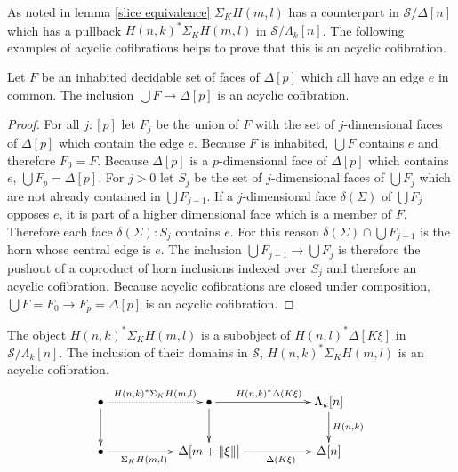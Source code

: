 \documentclass{tac}
\newcommand\cat\mathcal
\newcommand\ri{^*}
\newcommand\of{:}
\newcommand\simplex\Delta
\newcommand\horn\Lambda
\newcommand\norm[1]{\Vert #1 \Vert}
\newcommand\depsum{\Sigma_}
\newcommand\face\delta
\begin{document}
As noted in lemma \ref{slice equivalence} $\depsum K H(m,l)$ has a counterpart in $\cat S/\simplex[n]$ which has a pullback $H(n,k)\ri \depsum K H(m,l)$ in $\cat S/\horn_k[n]$. The following examples of acyclic cofibrations helps to prove that this is an acyclic cofibration.

\begin{lemma} Let $F$ be an inhabited decidable set of faces of $\simplex[p]$ which all have an edge $e$ in common. The inclusion $\bigcup F\to \simplex[p]$ is an acyclic cofibration. \label{face completion} \end{lemma}

\begin{proof} For all $j\of[p]$ let $F_j$ be the union of $F$ with the set of $j$-dimensional faces of $\simplex[p]$ which contain the edge $e$. Because $F$ is inhabited, $\bigcup F$ contains $e$ and therefore $F_0=F$. Because $\simplex[p]$ is a $p$-dimensional face of $\simplex[p]$ which contains $e$, $\bigcup F_p = \simplex[p]$. For $j>0$ let $S_j$ be the set of $j$-dimensional faces of $\bigcup F_j$ which are not already contained in $\bigcup F_{j-1}$. If a $j$-dimensional face $\face(\Sigma)$ of $\bigcup F_j$ opposes $e$, it is part of a higher dimensional face which is a member of $F$. Therefore each face $\face(\Sigma)\of S_j$ contains $e$. For this reason $\face(\Sigma)\cap \bigcup F_{j-1}$ is the horn whose central edge is $e$. The inclusion $\bigcup F_{j-1}\to\bigcup F_j$ is therefore the pushout of a coproduct of horn inclusions indexed over $S_j$ and therefore an acyclic cofibration. Because acyclic cofibrations are closed under composition, $\bigcup F = F_0\to F_p = \simplex[p]$ is an acyclic cofibration. 
\end{proof}

\begin{lemma} The object $H(n,k)\ri \depsum K H(m,l)$ is a subobject of $H(n,l)\ri\simplex[K\xi]$ in $\cat S/\horn_k[n]$. The inclusion of their domains in $\cat S$, $H(n,k)\ri \depsum K H(m,l)$ is an acyclic cofibration. \label{acyclic cofibrancy} 
\[\xymatrix{
\bullet \ar@{.>}[rr]^{H(n,k)\ri \depsum K H(m,l)} \ar[d] && \bullet\ar[rr]^{H(n,k)\ri\simplex(K\xi)}\ar[d] && \horn_k[n]\ar[d]^{H(n,k)}\\
\bullet\ar[rr]_(.4){\depsum K H(m,l)} && \simplex[m+\norm\xi]\ar[rr]_(.6){\simplex(K\xi)} && \simplex[n]
}\]
\end{lemma}
\end{document}
